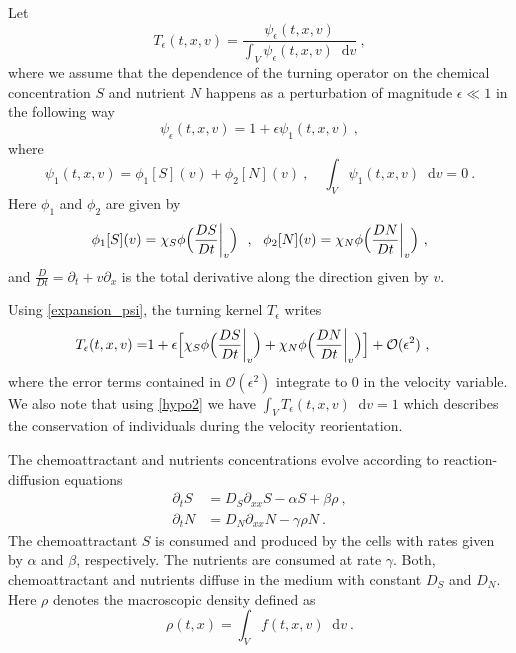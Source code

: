 \documentclass[11pt,twoside]{article}
\theoremstyle{nonumberplain}
\newcommand*\diff{\mathop{}\!\mathrm{d}}
\begin{document}
Let 
\begin{equation}\label{TepsFeps}
    T_\epsilon(t,x,v)=\frac{\psi_\epsilon(t,x,{v}) }{\displaystyle\int_{V}\psi_\epsilon(t,x,{v})  \diff {v}}\ ,
\end{equation}
where we assume that the dependence of the turning operator on the chemical concentration $S$ and nutrient $N$ happens as a perturbation of magnitude $\epsilon\ll 1$ in the following way
\begin{equation}\label{expansion_psi}
    \psi_\epsilon(t,x,{v})=1+\epsilon\psi_1(t,x,{v})\ ,
\end{equation}
where 
\begin{equation}
\psi_1(t,x,{v}) = \phi_1[S]({v}) + \phi_2[N]({v})\ , \quad\int_V\psi_1(t,x,{v})\diff {v}=0 \ . \label{hypo2}
\end{equation}
Here $\phi_1$ and $\phi_2$ are given by
$$\phi_1[S]({v})=\chi_S\phi\Bigl(\frac{DS}{Dt}\bigg\rvert_{v}\Bigr)\ \ ,\ \ \phi_2[N](v)= \chi_N\phi\Bigl(\frac{DN}{Dt}\bigg\rvert_{v}\Bigr)\ ,$$
and $\frac{D}{Dt}=\partial_t+{v}\partial_x$ is the total derivative along the direction given by ${v}$.


 
Using \eqref{expansion_psi}, the turning kernel $T_\epsilon$ writes
\begin{align}
    T_\epsilon(t,x,{v})=& 1+\epsilon\Bigl[\chi_S\phi\Bigl(\frac{DS}{Dt}\bigg\rvert_{v}\Bigr)+ \chi_N\phi\Bigl(\frac{DN}{Dt}\bigg\rvert_{v}\Bigr)\Bigr]  + {\mathcal{O}(\epsilon^2)} \ ,\label{eq: turning operator scaled}
\end{align}
{where the error terms contained in $\mathcal{O}(\epsilon^2)$ integrate to $0$ in the velocity variable. We also note that using \eqref{hypo2} we have $\int_V T_\epsilon(t,x,v)\diff v=1$ which describes the conservation of individuals during the velocity reorientation.}

The chemoattractant and nutrients concentrations evolve according to  reaction-diffusion equations
\begin{align}
    \partial_t S&=D_S\partial_{xx}S-\alpha S+\beta \rho\ ,\\
    \partial_t N&=D_N\partial_{xx}N-\gamma\rho N\ .
\end{align}
The chemoattractant $S$ is consumed and produced by the cells with rates given by $\alpha$ and $\beta$, respectively. The nutrients are consumed at rate $\gamma$. Both, chemoattractant and nutrients diffuse in the medium with constant $D_S$ and $D_N$. Here $\rho$ denotes the macroscopic density defined as
\[
\rho(t,x)=\int_Vf(t,x,v)\diff v\ .
\]
\end{document}
